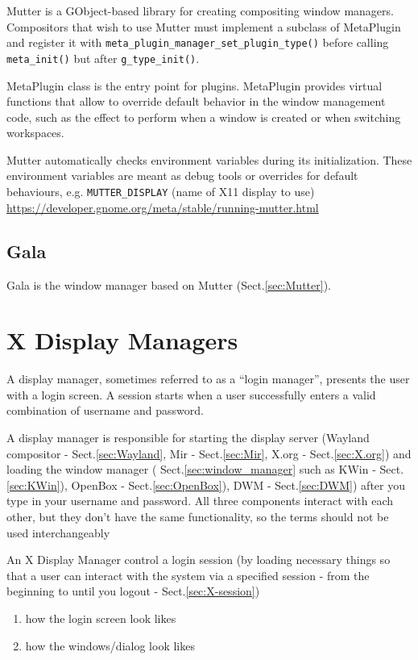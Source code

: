 Mutter is a GObject-based library for creating compositing window managers.
Compositors that wish to use Mutter must implement a subclass of MetaPlugin and
register it with \verb!meta_plugin_manager_set_plugin_type()! before calling
\verb!meta_init()! but after \verb!g_type_init()!. 

MetaPlugin class is the entry point for plugins.
MetaPlugin provides virtual functions that allow to override default behavior in
the window management code, such as the effect to perform when a window is
created or when switching workspaces. 

Mutter automatically checks environment variables during its initialization.
These environment variables are meant as debug tools or overrides for default
behaviours, e.g. \verb!MUTTER_DISPLAY! (name of X11 display to use)
\url{https://developer.gnome.org/meta/stable/running-mutter.html}



\subsection{Gala}

Gala is the window manager based on Mutter (Sect.\ref{sec:Mutter}).

\section{X Display Managers}
\label{sec:Display_manager}

A display manager, sometimes  referred to as a ``login manager'', presents the
user with a login screen. A session starts when a user successfully enters a
valid combination of username and password.

A display manager is responsible for starting the display server (Wayland
compositor - Sect.\ref{sec:Wayland}, Mir - Sect.\ref{sec:Mir}, X.org -
Sect.\ref{sec:X.org}) and loading the window manager (
Sect.\ref{sec:window_manager} such as KWin - Sect.\ref{sec:KWin}), OpenBox -
Sect.\ref{sec:OpenBox}), DWM - Sect.\ref{sec:DWM}) after you type in your
username and password.
All three components interact with each other, but they don't have the same
functionality, so the terms should not be used interchangeably


An X Display Manager control a login session (by loading necessary things so
that a user can interact with the system via a specified session - from the
beginning to until you logout - Sect.\ref{sec:X-session})
\begin{enumerate}
  \item how the login screen look likes
  
  \item how the windows/dialog look likes
\end{enumerate}


